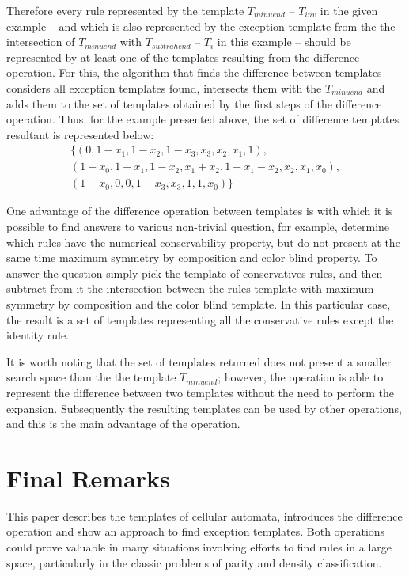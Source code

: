 \documentclass{llncs}
\begin{document}
Therefore every rule represented  by the template $T_{minuend}$ -- $T_{inv}$ in the given example -- and which is also represented by the exception template from the the intersection of $T_{minuend}$ with $T_{subtrahend}$ -- $T_i$ in this example -- should be represented by at least one of the templates resulting from the difference operation. For this, the algorithm that finds the difference between templates considers all exception templates found, intersects them with the $T_{minuend}$ and adds them to the set of templates obtained by the first steps of the difference operation. Thus, for the example presented above, the set of difference templates resultant is represented below:\begin{displaymath}
\begin{split}
\{(0, 1 - x_1, 1 - x_2, 1 - x_3, x_3, x_2, x_1, 1), \\
(1 - x_0, 1 - x_1, 1 - x_2, x_1 + x_2, 1 - x_1 - x_2, x_2, x_1, x_0), \\
(1 - x_0, 0, 0, 1 - x_3, x_3, 1, 1, x_0)\}
\label{eq:differenceR}
\end{split}
\end{displaymath}

One advantage of the difference operation between templates is with which it is possible to find answers to various non-trivial question, for example, determine which rules have the numerical conservability property, but do not present at the same time maximum symmetry by composition and color blind property. To answer the question simply pick the template of conservatives rules, and then subtract from it the intersection between the rules template with maximum symmetry by composition and the color blind template. In this particular case, the result is a set of templates representing all the conservative rules except the identity rule.

It is worth noting that the set of templates returned does not present a smaller search space than the the template $T_{minuend}$; however, the operation is able to represent the difference between two templates without the need to perform the expansion. Subsequently the resulting templates can be used by other operations, and this is the main advantage of the operation.









\section{Final Remarks}
\label{sec:consideracoes_finais}
This paper describes the templates of cellular automata, 
introduces the difference operation and show an approach to find exception templates. Both operations could prove valuable in many situations involving efforts to find rules in a large space, particularly in the classic problems of parity and density classification.
\end{document}
